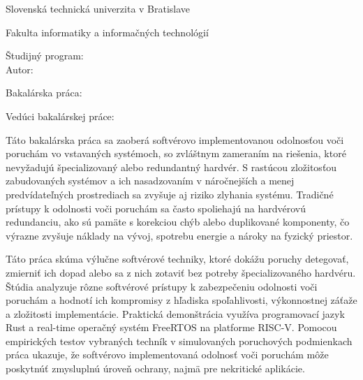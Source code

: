 \begin{minipage}[t]{1\columnwidth}%
Slovenská technická univerzita v Bratislave

Fakulta informatiky a informačných technológií

Študijný program: \myStudyProgram\\

Autor: \myName

Bakalárska práca: \myTitle

Vedúci bakalárskej práce: \mySupervisor

\myDate%
\end{minipage}

\bigskip{}

Táto bakalárska práca sa zaoberá softvérovo implementovanou odolnosťou voči poruchám vo vstavaných systémoch, so zvláštnym zameraním na riešenia, ktoré nevyžadujú špecializovaný alebo redundantný hardvér. S rastúcou zložitosťou zabudovaných systémov a ich nasadzovaním v náročnejších a menej predvídateľných prostrediach sa zvyšuje aj riziko zlyhania systému. Tradičné prístupy k odolnosti voči poruchám sa často spoliehajú na hardvérovú redundanciu, ako sú pamäte s korekciou chýb alebo duplikované komponenty, čo výrazne zvyšuje náklady na vývoj, spotrebu energie a nároky na fyzický priestor.

Táto práca skúma výlučne softvérové techniky, ktoré dokážu poruchy detegovať, zmierniť ich dopad alebo sa z nich zotaviť bez potreby špecializovaného hardvéru. Štúdia analyzuje rôzne softvérové prístupy k zabezpečeniu odolnosti voči poruchám a hodnotí ich kompromisy z hľadiska spoľahlivosti, výkonnostnej záťaže a zložitosti implementácie. Praktická demonštrácia využíva programovací jazyk Rust a real-time operačný systém FreeRTOS na platforme RISC-V. Pomocou empirických testov vybraných techník v simulovaných poruchových podmienkach práca ukazuje, že softvérovo implementovaná odolnosť voči poruchám môže poskytnúť zmysluplnú úroveň ochrany, najmä pre nekritické aplikácie.

\clearpage


